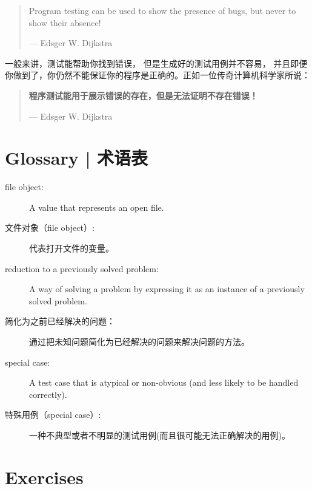 \begin{quote}
Program testing can be used to show the presence of bugs, but never to
show their absence!

--- Edsger W. Dijkstra
\end{quote}

一般来讲，测试能帮助你找到错误， 但是生成好的测试用例并不容易，
并且即便你做到了，你仍然不能保证你的程序是正确的。正如一位传奇计算机科学家所说：
\begin{quote}
{\bf 程序测试能用于展示错误的存在，但是无法证明不存在错误！}

--- Edsger W. Dijkstra
\end{quote}


\section{Glossary  |  术语表}

\begin{description}

\item[file object:] A value that represents an open file.

\item[文件对象（file object）:] 代表打开文件的变量。

\item[reduction to a previously solved problem:] A way of solving a
  problem by expressing it as an instance of a previously solved
  problem.

\item[简化为之前已经解决的问题：] 通过把未知问题简化为已经解决的问题来解决问题的方法。

\item[special case:] A test case that is atypical or non-obvious
(and less likely to be handled correctly).

\item[特殊用例（special case）:] 一种不典型或者不明显的测试用例(而且很可能无法正确解决的用例)。

\end{description}


\section{Exercises}

